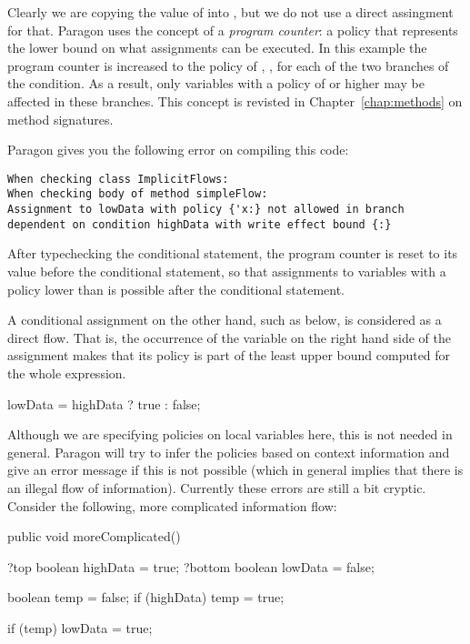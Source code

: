 Clearly we are copying the value of  into
, but we do not use a direct assingment for that. Paragon
uses the concept of a \emph{program counter}: a policy that represents the
lower bound on what assignments can be executed. In this example the program
counter is increased to the policy of , ,
for each of the two branches of the condition. As a result, only variables with
a policy of  or higher may be affected in these branches. This 
concept is revisted in Chapter~\ref{chap:methods} on method signatures.

Paragon gives you the following error on compiling this code:

\begin{lstlisting}
When checking class ImplicitFlows:
When checking body of method simpleFlow:
Assignment to lowData with policy {'x:} not allowed in branch dependent on condition highData with write effect bound {:}
\end{lstlisting}

After typechecking the conditional statement, the program counter is reset 
to its value before the conditional statement, so
that assignments to variables with a policy lower than  is 
possible after the conditional statement.

A conditional assignment on the other hand, such as below, is considered as a
direct flow. That is, the occurrence of the variable  on
the right hand side of the assignment makes that its policy is part of the least upper
bound computed for the whole expression. 

\begin{paragoncode}
lowData = highData ? true : false;
\end{paragoncode}

Although we are specifying policies on local variables here, this is not needed
in general. Paragon will try to infer the policies based on context information
and give an error message if this is not possible (which in general implies that
there is an illegal flow of information). Currently these errors are still a bit
cryptic. Consider the following, more complicated information flow:
\begin{paragoncode}
  public void moreComplicated() {
  
    ?top boolean highData = true;
    ?bottom boolean lowData = false;
    
    boolean temp = false;
    if (highData)
      temp = true;
            
    if (temp)
      lowData = true;
      
  }
\end{paragoncode}

